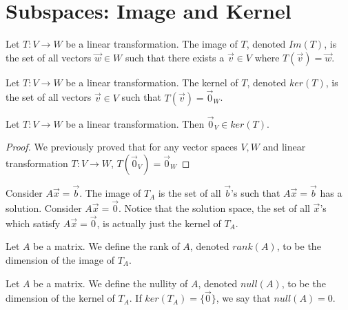 \section{Subspaces: Image and Kernel}
\begin{definition}
    Let $T:V\to W$ be a linear transformation. The image of $T$, denoted $Im(T)$, is the set of all vectors $\vec{w}\in W$ such that there exists a $\vec{v}\in V$ where $T(\vec{v})=\vec{w}$.
\end{definition}
\begin{definition}
    Let $T:V\to W$ be a linear transformation. The kernel of $T$, denoted $ker(T)$, is the set of all vectors $\vec{v}\in V$ such that $T(\vec{v})=\vec{0}_W$.
\end{definition}
\begin{theorem}
    Let $T:V\to W$ be a linear transformation. Then $\vec{0}_V\in ker(T)$.
\end{theorem}
\begin{proof}
    We previously proved that for any vector spaces $V, W$ and linear transformation $T:V\to W$, $T(\vec{0}_V)=\vec{0}_W$
\end{proof}
Consider $A\vec{x}=\vec{b}$. The image of $T_A$ is the set of all $\vec{b}$'s such that $A\vec{x}=\vec{b}$ has a solution. Consider $A\vec{x}=\vec{0}$. Notice that the solution space, the set of all $\vec{x}$'s which satisfy $A\vec{x}=\vec{0}$, is actually just the kernel of $T_A$.
\begin{definition}
    Let $A$ be a matrix. We define the rank of $A$, denoted $rank(A)$, to be the dimension of the image of $T_A$.
\end{definition}
\begin{definition}
    Let $A$ be a matrix. We define the nullity of $A$, denoted $null(A)$, to be the dimension of the kernel of $T_A$. If $ker(T_A)=\{\vec{0}\}$, we say that $null(A)=0$.
\end{definition}
